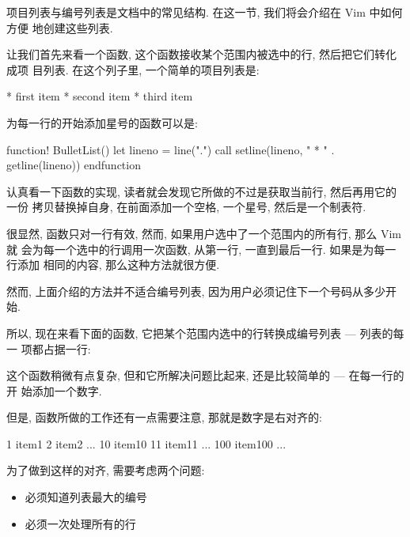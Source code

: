 项目列表与编号列表是文档中的常见结构. 在这一节, 我们将会介绍在 Vim 中如何方便
地创建这些列表.

让我们首先来看一个函数, 这个函数接收某个范围内被选中的行, 然后把它们转化成项
目列表. 在这个列子里, 一个简单的项目列表是:
\begin{vimcode}
* first item
* second item
* third item
\end{vimcode}
为每一行的开始添加星号的函数可以是:
\begin{vimcode}
function! BulletList()
    let lineno = line(".")
    call setline(lineno, "    * " . getline(lineno))
endfunction
\end{vimcode}

认真看一下函数的实现, 读者就会发现它所做的不过是获取当前行, 然后再用它的一份
拷贝替换掉自身, 在前面添加一个空格, 一个星号, 然后是一个制表符.

很显然, 函数只对一行有效, 然而, 如果用户选中了一个范围内的所有行, 那么 Vim 就
会为每一个选中的行调用一次函数, 从第一行, 一直到最后一行. 如果是为每一行添加
相同的内容, 那么这种方法就很方便.

然而, 上面介绍的方法并不适合编号列表, 因为用户必须记住下一个号码从多少开始.

所以, 现在来看下面的函数, 它把某个范围内选中的行转换成编号列表 --- 列表的每一
项都占据一行:

这个函数稍微有点复杂, 但和它所解决问题比起来, 还是比较简单的 --- 在每一行的开
始添加一个数字.

但是, 函数所做的工作还有一点需要注意, 那就是数字是右对齐的:
\begin{vimcode}
    1 item1
    2 item2
    ...
   10 item10
   11 item11
    ...
  100 item100
    ...
\end{vimcode}

为了做到这样的对齐, 需要考虑两个问题:
\begin{itemize}
    \item 必须知道列表最大的编号
    \item 必须一次处理所有的行
\end{itemize}

